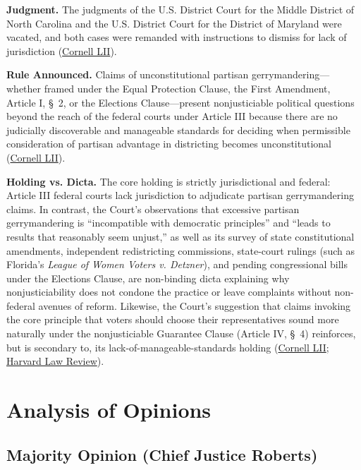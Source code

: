 \documentclass[12pt]{article}
\begin{document}
\textbf{Judgment.} The judgments of the U.S. District Court for the Middle District of North Carolina and the U.S. District Court for the District of Maryland were vacated, and both cases were remanded with instructions to dismiss for lack of jurisdiction (\href{https://www.law.cornell.edu/supremecourt/text/18-422}{Cornell LII}).

\textbf{Rule Announced.} Claims of unconstitutional partisan gerrymandering---whether framed under the Equal Protection Clause, the First Amendment, Article I, \S~2, or the Elections Clause---present nonjusticiable political questions beyond the reach of the federal courts under Article III because there are no judicially discoverable and manageable standards for deciding when permissible consideration of partisan advantage in districting becomes unconstitutional (\href{https://www.law.cornell.edu/supremecourt/text/18-422}{Cornell LII}).

\textbf{Holding vs. Dicta.} The core holding is strictly jurisdictional and federal: Article III federal courts lack jurisdiction to adjudicate partisan gerrymandering claims. In contrast, the Court's observations that excessive partisan gerrymandering is ``incompatible with democratic principles'' and ``leads to results that reasonably seem unjust,'' as well as its survey of state constitutional amendments, independent redistricting commissions, state-court rulings (such as Florida's \textit{League of Women Voters v. Detzner}), and pending congressional bills under the Elections Clause, are non-binding dicta explaining why nonjusticiability does not condone the practice or leave complaints without non-federal avenues of reform. Likewise, the Court's suggestion that claims invoking the core principle that voters should choose their representatives sound more naturally under the nonjusticiable Guarantee Clause (Article IV, \S~4) reinforces, but is secondary to, its lack-of-manageable-standards holding (\href{https://www.law.cornell.edu/supremecourt/text/18-422}{Cornell LII}; \href{https://harvardlawreview.org/print/vol-133/rucho-v-common-cause/}{Harvard Law Review}).

\section{Analysis of Opinions}

\subsection{Majority Opinion (Chief Justice Roberts)}
\end{document}
